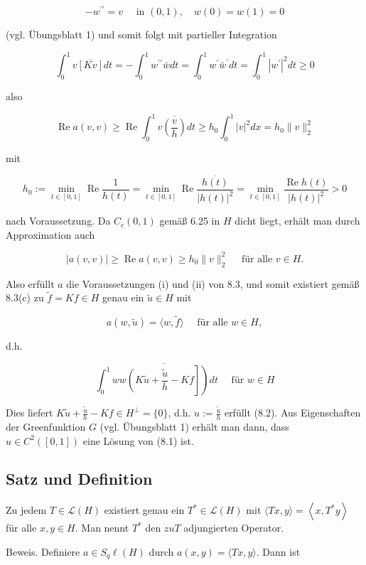 \documentclass[10pt, letterpaper]{article}
\begin{document}
$$
-w^{\prime \prime}=v \quad \text { in }(0,1), \quad w(0)=w(1)=0
$$

(vgl. Übungsblatt 1) und somit folgt mit partieller Integration

$$
\int_{0}^{1} v \overline{[K v]} d t=-\int_{0}^{1} w^{\prime \prime} \bar{w} d t=\int_{0}^{1} w^{\prime} \bar{w}^{\prime} d t=\int_{0}^{1}\left|w^{\prime}\right|^{2} d t \geq 0
$$

also

$$
\operatorname{Re} a(v, v) \geq \operatorname{Re} \int_{0}^{1} v \overline{\left(\frac{v}{h}\right)} d t \geq h_{0} \int_{0}^{1}|v|^{2} d x=h_{0}\|v\|_{2}^{2}
$$

mit

$$
h_{0}:=\min _{t \in[0,1]} \operatorname{Re} \frac{1}{h(t)}=\min _{t \in[0,1]} \operatorname{Re} \frac{\overline{h(t)}}{|h(t)|^{2}}=\min _{t \in[0,1]} \frac{\operatorname{Re} h(t)}{|h(t)|^{2}}>0
$$

nach Voraussetzung. Da $C_{c}(0,1)$ gemäß 6.25 in $H$ dicht liegt, erhält man durch Approximation auch

$$
|a(v, v)| \geq \operatorname{Re} a(v, v) \geq h_{0}\|v\|_{2}^{2} \quad \text { für alle } v \in H .
$$

Also erfüllt $a$ die Voraussetzungen (i) und (ii) von 8.3, und somit existiert gemäß 8.3(c) zu $\tilde{f}=K f \in H$ genau ein $\tilde{u} \in H$ mit

$$
a(w, \tilde{u})=\langle w, \tilde{f}\rangle \quad \text { für alle } w \in H,
$$

d.h.

$$
\int_{0}^{1} w \overline{\left.w\left(K \tilde{u}+\frac{\tilde{u}}{h}-K f\right]\right)} d t \quad \text { für } w \in H
$$

Dies liefert $K \tilde{u}+\frac{\tilde{u}}{h}-K f \in H^{\perp}=\{0\}$, d.h. $u:=\frac{\tilde{u}}{h}$ erfüllt (8.2). Aus Eigenschaften der Greenfunktion $G$ (vgl. Übungsblatt 1) erhält man dann, dass $u \in C^{2}([0,1])$ eine Lösung von (8.1) ist.

\subsection*{Satz und Definition}
Zu jedem $T \in \mathcal{L}(H)$ existiert genau ein $T^{*} \in \mathcal{L}(H)$ mit $\langle T x, y\rangle=\left\langle x, T^{*} y\right\rangle$ für alle $x, y \in H$. Man nennt $T^{*}$ den $z u T$ adjungierten Operator.

Beweis. Definiere $a \in S_{q} \ell(H)$ durch $a(x, y)=\langle T x, y\rangle$. Dann ist
\end{document}
